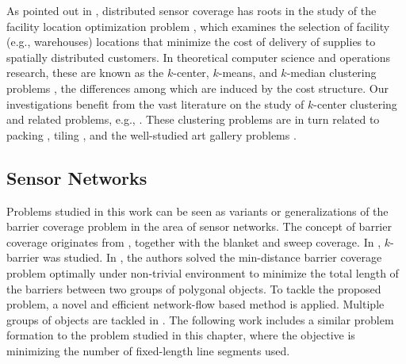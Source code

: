 As pointed out in \cite{cortes2004coverage,schwager2009decentralized}, 
distributed sensor coverage has roots in the study 
of the facility location optimization problem 
\cite{weber1929theory,drezner1995facility}, which examines the selection 
of facility (e.g., warehouses) locations that minimize the cost of delivery 
of supplies to spatially distributed customers. In theoretical computer 
science and operations research, these are known as the $k$-center, 
$k$-means, and $k$-median clustering problems \cite{har2011geometric}, 
the differences among which are induced by the cost structure. Our 
investigations benefit from the vast literature on 
the study of $k$-center clustering and related problems, e.g., 
\cite{feder1988optimal,hochbaum1985best,gonzalez1985clustering,daskin2000new,shamos1975closest}.
%
These clustering problems are in turn related to packing 
\cite{hales2005proof}, tiling \cite{thue1910dichteste}, and the 
well-studied art gallery problems \cite{o1987art,shermer1992recent}.

\subsection{Sensor Networks}
Problems studied in this work can be seen as variants or generalizations of the barrier coverage problem in the area of sensor networks.
The concept of barrier coverage originates from \cite{gage1992command}, together with the blanket and sweep coverage. 
In \cite{kumar2005barrier}, $k$-barrier was studied. 
In \cite{kloder2007barrier}, the authors solved the min-distance barrier coverage problem optimally under non-trivial environment to minimize the total length of the barriers between two groups of polygonal objects. 
To tackle the proposed problem, a novel and efficient network-flow based method is applied. 
Multiple groups of objects are tackled in \cite{abrahamsen2020geometric}.
The following work \cite{kloder2008thesis} includes a similar problem formation to the problem studied in this chapter, where the objective is minimizing the number of fixed-length line segments used. 

